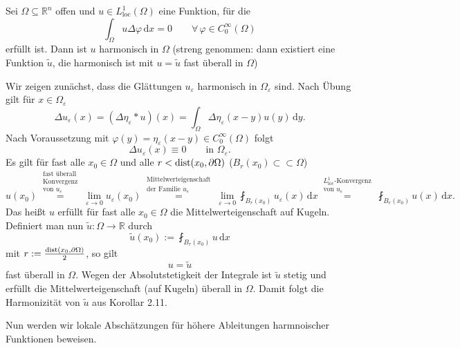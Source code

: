 \begin{satz}
	Sei $\Omega \subseteq \mathbb{R}^n$ offen und $u \in L^1_{\text{loc}}(\Omega)$ eine Funktion, für die 
	\begin{equation}
		\int_{\Omega}^{} u \Delta \varphi \,\mathrm{d}x = 0 \qquad \forall\, \varphi \in C^{\infty}_0(\Omega)
	\end{equation}
	erfüllt ist. 
	Dann ist $u$ harmonisch in $\Omega$ (streng genommen: dann existiert eine Funktion $\tilde u$, die harmonisch ist mit $u = \tilde u$ fast überall in $\Omega$)
\end{satz}

\begin{beweis}
	Wir zeigen zunächst, dass die Glättungen $u_{\varepsilon}$ harmonisch in $\Omega_{\varepsilon}$ sind. Nach Übung gilt für $x \in \Omega_{\varepsilon}$
	\[
		\Delta u_{\varepsilon}(x) = ( \Delta \eta_{\varepsilon} * u)(x) = \int_{\Omega}^{} \Delta \eta_{\varepsilon}(x-y)u(y) \,\mathrm{d}y.
	\]
	Nach Voraussetzung mit $\varphi(y)= \eta_{\varepsilon}(x-y) \in C^{\infty}_0(\Omega)$ folgt 
	\[
		\Delta u_{\varepsilon}(x) \equiv 0 \qquad \text{in }\Omega_{\varepsilon}.
	\]
	Es gilt für fast alle $x_0 \in \Omega$ und alle $r < \operatorname{dist}(x_0, \partial \Omega)$ ($B_r(x_0) \subset \subset \Omega$) 
	\begin{equation}
		u(x_0) \stackrel{\substack{\text{fast überall}\\\text{Konvergenz}\\\text{von }u_{\varepsilon}}}{=}
		\lim_{\varepsilon \to 0} u_{\varepsilon}(x_0) 
		\stackrel{\substack{\text{Mittelwerteigenschaft} \\\text{der Familie }u_{\varepsilon}}}{=} \lim_{\varepsilon \to 0} 
		\fint_{B_r(x_0)}^{}u_{\varepsilon}(x) \,\mathrm{d}x 
		\stackrel{\substack{L^1_{\text{loc}}\text{-Konvergenz}\\ \text{von }u_{\varepsilon}}}{=}
		\fint_{B_r(x_0)}^{} u(x) \,\mathrm{d}x.
	\end{equation}
	Das heißt $u$ erfüllt für fast alle $x_0 \in \Omega$ die Mittelwerteigenschaft auf Kugeln. 
	Definiert man nun $\tilde u: \Omega \to \mathbb{R}$ durch
	\[
		\tilde u(x_0):= \fint_{B_r(x_0)}^{}u \,\mathrm{d}x
	\]
	mit $r:= \frac{\operatorname{dist}(x_0, \partial \Omega)}{2}$, so gilt 
	\begin{equation}
		u = \tilde u
	\end{equation}
	fast überall in $\Omega$. Wegen der Absolutstetigkeit der Integrale ist $\tilde u$ stetig und erfüllt die Mittelwerteigenschaft (auf Kugeln) überall in $\Omega$.
	Damit folgt die Harmonizität von $\tilde u$ aus Korollar 2.11.
\end{beweis}
Nun werden wir lokale Abschätzungen für höhere Ableitungen harmnoischer Funktionen beweisen.

